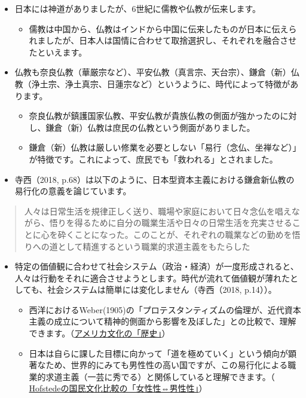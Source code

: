 \documentclass[
]{book}
\providecommand{\tightlist}{%
  \setlength{\itemsep}{0pt}\setlength{\parskip}{0pt}}
\begin{document}
\begin{itemize}
\item
  日本には神道がありましたが、6世紀に儒教や仏教が伝来します。

  \begin{itemize}
  \tightlist
  \item
    儒教は中国から、仏教はインドから中国に伝来したものが日本に伝えられましたが、日本人は国情に合わせて取捨選択し、それぞれを融合させたといえます。
  \end{itemize}
\item
  仏教も奈良仏教（華厳宗など）、平安仏教（真言宗、天台宗）、鎌倉（新）仏教（浄土宗、浄土真宗、日蓮宗など）というように、時代によって特徴があります。

  \begin{itemize}
  \item
    奈良仏教が鎮護国家仏教、平安仏教が貴族仏教の側面が強かったのに対し、鎌倉（新）仏教は庶民の仏教という側面がありました。
  \item
    鎌倉（新）仏教は厳しい修業を必要としない「易行（念仏、坐禅など）」が特徴です。これによって、庶民でも「救われる」とされました。
  \end{itemize}
\item
  寺西（2018, p.68）は以下のように、日本型資本主義における鎌倉新仏教の易行化の意義を論じています。
\end{itemize}

\begin{quote}
人々は日常生活を規律正しく送り、職場や家庭において日々念仏を唱えながら、悟りを得るために自分の職業生活や日々の日常生活を充実させることに心を砕くことになった。このことが、それぞれの職業などの勤めを悟りへの道として精進するという職業的求道主義をもたらした
\end{quote}

\begin{itemize}
\item
  特定の価値観に合わせて社会システム（政治・経済）が一度形成されると、人々は行動をそれに適合させようとします。時代が流れて価値観が薄れたとしても、社会システムは簡単には変化しません（寺西（2018, p.14））。

  \begin{itemize}
  \item
    西洋におけるWeber(1905)の「プロテスタンティズムの倫理が、近代資本主義の成立について精神的側面から影響を及ぼした」との比較で、理解できます。（\protect\hyperlink{us-culture}{アメリカ文化の「歴史」}）
  \item
    日本は自らに課した目標に向かって「道を極めていく」という傾向が顕著なため、世界的にみても男性性の高い国ですが、この易行化による職業的求道主義（一芸に秀でる）と関係していると理解できます。（ \protect\hyperlink{hofstede}{Hofstedeの国民文化比較の「女性性⇔男性性」}）
  \end{itemize}
\end{itemize}
\end{document}
